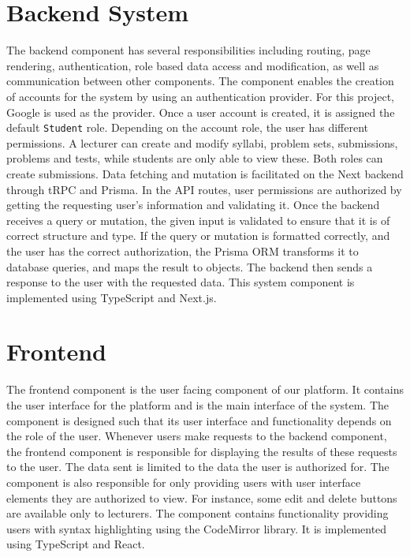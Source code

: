 \section{Backend System}
The backend component has several responsibilities including routing, page rendering, authentication, role based data access and modification, as well as communication between other components.
The component enables the creation of accounts for the system by using an authentication provider.
For this project, Google is used as the provider.
Once a user account is created, it is assigned the default \texttt{Student} role.
Depending on the account role, the user has different permissions.
A lecturer can create and modify syllabi, problem sets, submissions, problems and tests, while students are only able to view these. Both roles can create submissions.
Data fetching and mutation is facilitated on the Next backend through tRPC and Prisma. In the API routes, user permissions are authorized by getting the requesting user's information and validating it.
Once the backend receives a query or mutation, the given input is validated to ensure that it is of correct structure and type.
If the query or mutation is formatted correctly, and the user has the correct authorization, the Prisma ORM transforms it to database queries, and maps the result to \javascript{} objects.
The backend then sends a response to the user with the requested data.
This system component is implemented using TypeScript and Next.js.

\section{Frontend} \label{sec:architecture-frontend}
The frontend component is the user facing component of our platform.  It contains the user interface for the platform and is the main interface of the system.
The component is designed such that its user interface and functionality depends on the role of the user.
Whenever users make requests to the backend component, the frontend component is responsible for displaying the results of these requests to the user. The data sent is limited to the data the user is authorized for.
The component is also responsible for only providing users with user interface elements they are authorized to view.
For instance, some edit and delete buttons are available only to lecturers.
The component contains functionality providing users with syntax highlighting using the CodeMirror library.
It is implemented using TypeScript and React.

